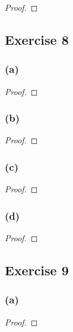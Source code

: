 \documentclass[14pt]{extarticle}
\begin{document}
\begin{proof}

\end{proof}

\subsection{Exercise 8}

\subsubsection{(a)}

\begin{proof}

\end{proof}

\subsubsection{(b)}

\begin{proof}

\end{proof}

\subsubsection{(c)}

\begin{proof}

\end{proof}

\subsubsection{(d)}

\begin{proof}

\end{proof}

\subsection{Exercise 9}

\subsubsection{(a)}

\begin{proof}

\end{proof}
\end{document}
